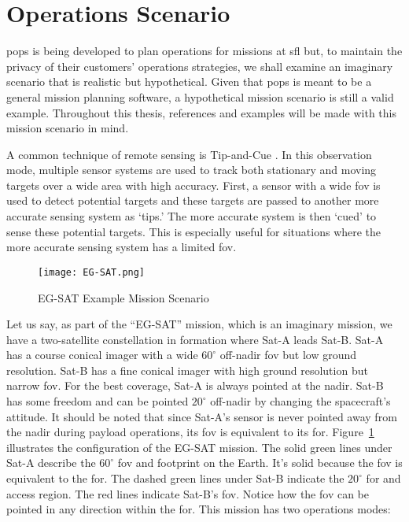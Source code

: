 \section{Operations Scenario}

\gls{pops} is being developed to plan operations for missions at \gls{sfl} but,
to maintain the privacy of their customers' operations strategies, we shall
examine an imaginary scenario that is realistic but hypothetical. Given that
\gls{pops} is meant to be a general mission planning software, a hypothetical
mission scenario is still a valid example. Throughout this thesis, references
and examples will be made with this mission scenario in mind.

A common technique of remote sensing is Tip-and-Cue \cite{ali_tip_2021}.  In
this observation mode, multiple sensor systems are used to track both
stationary and moving targets over a wide area with high accuracy. First, a
sensor with a wide \gls{fov} is used to detect potential targets and these
targets are passed to another more accurate sensing system as ‘tips.’ The more
accurate system is then ‘cued’ to sense these potential targets. This is
especially useful for situations where the more accurate sensing system has a
limited \gls{fov}.

\begin{figure}[h]
    \centering
    \texttt{[image: EG-SAT.png]} 
    \caption{EG-SAT Example Mission Scenario}
    \label{fig:eg-sat-1} 
\end{figure}

Let us say, as part of the “EG-SAT” mission, which is an imaginary mission, we
have a two-satellite constellation in formation where Sat-A leads Sat-B. Sat-A
has a course conical imager with a wide $60^\circ$ off-nadir \gls{fov} but low
ground resolution.  Sat-B has a fine conical imager with high ground resolution
but narrow \gls{fov}.  For the best coverage, Sat-A is always pointed at the
nadir.  Sat-B has some freedom and can be pointed $20^\circ$ off-nadir by
changing the spacecraft’s attitude.  It should be noted that since Sat-A’s
sensor is never pointed away from the nadir during payload operations, its
\gls{fov} is equivalent to its \gls{for}. Figure~\ref{fig:eg-sat-1} illustrates
the configuration of the EG-SAT mission.  The solid green lines under Sat-A
describe the $60^\circ$ \gls{fov} and footprint on the Earth. It's solid
because the \gls{fov} is equivalent to the \gls{for}. The dashed green lines
under Sat-B indicate the $20^\circ$ \gls{for} and access region. The red lines
indicate Sat-B's \gls{fov}. Notice how the \gls{fov} can be pointed in any
direction within the \gls{for}. This mission has two operations modes: 

